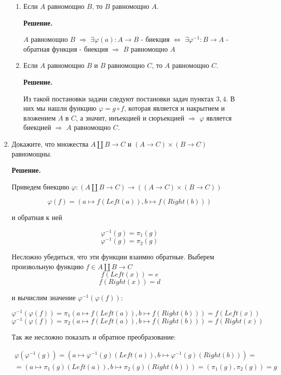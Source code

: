 \begin{enumerate}
\begin{enumerate}
\item Если $A$ равномощно $B$, то $B$ равномощно $A$.

\textbf{Решение.} 

$A$ равномощно $B$ $\Rightarrow$ $\exists \varphi(a):A\rightarrow B$ - биекция 
$\Leftrightarrow$ $\exists \varphi^{-1} : B \rightarrow A$ - обратная функция - биекция 
$\Rightarrow$ $B$ равномощно $A$ 


\item Если $A$ равномощно $B$ и $B$ равномощно $C$, то $A$ равномощно $C$.

\textbf{Решение.} 

Из такой постановки задачи следуют постановки задач пунктах $3, 4$. В них мы нашли функцию 
$\varphi = g \circ f$, которая является и накрытием и вложением $A$ в $C$, а значит, инъекцией 
и сюръекцией $\Rightarrow$ $\varphi$ является биекцией $\Rightarrow$ $A$ равномощно $C$.

\end{enumerate}

\item Докажите, что множества $A \amalg B \to C$ и $(A \to C) \times (B \to C)$ равномощны.

\textbf{Решение.} 

Приведем биекцию $\varphi : (A \amalg B \to C) \rightarrow ((A \to C) \times (B \to C))$

$$\varphi(f) = (a \mapsto f(Left(a)), b \mapsto f(Right(b)))$$

и обратная к ней

$$\varphi^{-1}(g) = \pi_1(g)$$
$$\varphi^{-1}(g) = \pi_2(g)$$

Несложно убедиться, что эти функции взаимно обратные.
Выберем произвольную функцию $f\in A \amalg B \to C$
$$f(Left(x)) = e$$
$$f(Right(x)) = d$$

и вычислим значение $\varphi^{-1}(\varphi(f))$:

$$\varphi^{-1}(\varphi(f)) = \pi_1(a \mapsto f(Left(a)), b \mapsto f(Right(b))) = f(Left(x))$$
$$\varphi^{-1}(\varphi(f)) = \pi_2(a \mapsto f(Left(a)), b \mapsto f(Right(b))) = f(Right(x))$$

Так же несложно показать и обратное преобразование:

\begin{equation*}
\begin{array} {lcl}
	\varphi(\varphi^{-1}(g)) = (a \mapsto \varphi^{-1}(g)(Left(a)), b \mapsto \varphi^{-1}(g)(Right(b))) = \\
	= (a \mapsto \pi_1(g)(Left(a)), b \mapsto \pi_2(g)(Right(b))) = (\pi_1(g), \pi_2(g)) = g
\end{array}
\end{equation*}


\end{enumerate}
